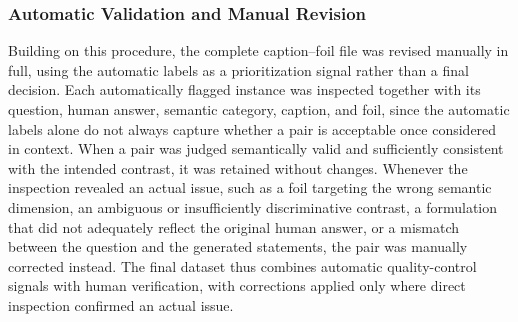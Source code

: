 \subsubsection*{Automatic Validation and Manual Revision}
Building on this procedure, the complete caption--foil file was revised manually in full, using the automatic labels as a prioritization signal rather than a final decision. Each automatically flagged instance was inspected together with its question, human answer, semantic category, caption, and foil, since the automatic labels alone do not always capture whether a pair is acceptable once considered in context. When a pair was judged semantically valid and sufficiently consistent with the intended contrast, it was retained without changes. Whenever the inspection revealed an actual issue, such as a foil targeting the wrong semantic dimension, an ambiguous or insufficiently discriminative contrast, a formulation that did not adequately reflect the original human answer, or a mismatch between the question and the generated statements, the pair was manually corrected instead. The final dataset thus combines automatic quality-control signals with human verification, with corrections applied only where direct inspection confirmed an actual issue.
